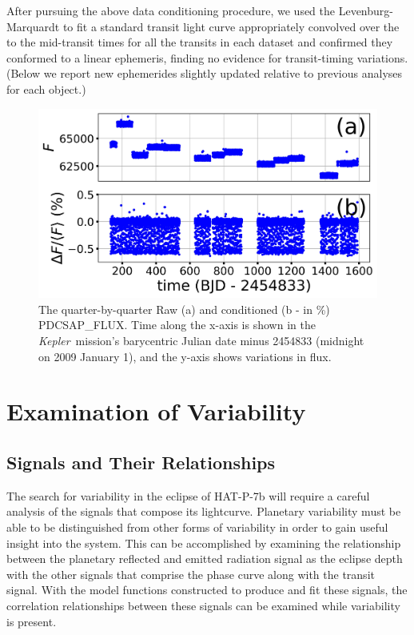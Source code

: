 \documentclass[manuscript]{aastex}
\newcommand{\kepler}{{\it Kepler}}
\begin{document}
After pursuing the above data conditioning procedure, we used the Levenburg-Marquardt to fit a standard transit light curve \citep{2002ApJ...580L.171M} appropriately convolved over the to the mid-transit times for all the transits in each dataset and confirmed they conformed to a linear ephemeris, finding no evidence for transit-timing variations. (Below we report new ephemerides slightly updated relative to previous analyses for each object.) 


\begin{figure}
\includegraphics[width=\textwidth]{Analysis_of_Kepler76b_data.jpg}
\caption{The quarter-by-quarter Raw (a) and conditioned (b - in \%) PDCSAP\_FLUX. Time along the x-axis is shown in the \kepler\ mission's barycentric Julian date minus 2454833 (midnight on 2009 January 1), and the y-axis shows variations in flux. \label{fig:Analysis_of_Kepler76b_data}}
\end{figure}

\section{Examination of Variability}

\subsection{Signals and Their Relationships}

	The search for variability in the eclipse of HAT-P-7b will require a careful analysis of the signals that compose its lightcurve. Planetary variability must be able to be distinguished from other forms of variability in order to gain useful insight into the system. This can be accomplished by examining the relationship between the planetary reflected and emitted radiation signal as the eclipse depth with the other signals that comprise the phase curve along with the transit signal. With the model functions constructed to produce and fit these signals, the correlation relationships between these signals can be examined while variability is present. 
    
\end{document}
